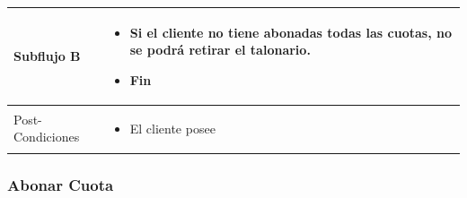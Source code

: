 \documentclass[12pt,a4paper]{article}
\newenvironment{myitemize}
{\begin{itemize}[leftmargin=*,noitemsep,topsep=0pt]}{\end{itemize}}
\begin{document}
\begin{center}
\begin{tabular}{|l|p{10cm}|}
				Subflujo B &
					\begin{myitemize}
						\item Si el cliente no tiene abonadas todas las cuotas, no se podrá retirar el talonario.
						\item Fin
					\end{myitemize} \\ \hline

				Post-Condiciones & 
					\begin{myitemize}
						\item El cliente posee 
					\end{myitemize}\\ \hline
			\end{tabular}
		\end{center}

		\subsubsection{Abonar Cuota}
\end{document}
